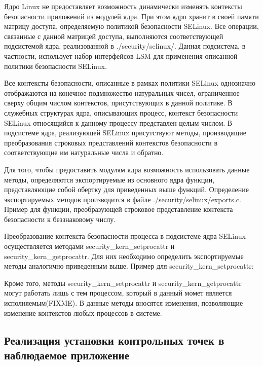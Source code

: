 Ядро Linux не предоставляет возможность динамически изменять
контексты безопасности приложений из модулей ядра. При этом
ядро хранит в своей памяти матрицу доступа, определяемую
политикой безопасности SELinux. Все операции, связанные с
данной матрицей доступа, выполняются соответствующей подсистемой
ядра, реализованной в ./security/selinux/. Данная подсистема,
в частности, использует набор интерфейсов LSM для применения
описанной политики безопасности SELinux.

Все контексты безопасности, описанные в рамках политики SELinux
однозначно отображаются на конечное подмножество натуральных чисел,
ограниченное сверху общим числом контекстов, присутствующих в
данной политике. В служебных структурах ядра, описывающих процесс,
контекст безопасности SELinux относящийся к данному процессу
представлен целым числом. В подсистеме ядра, реализующей SELinux
присутствуют методы, производящие преобразования строковых
представлений контекстов безопасности в соответствующие им
натуральные числа и обратно.



Для того, чтобы предоставить модулям ядра возможность использовать
данные методы, определяются экспортируемые из основного ядра функции,
представляющие собой обертку для приведенных выше функций. Определение
экспортируемых методов производится в файле ./security/selinux/exports.c.
Пример для функции, преобразующей строковое представление контекста
безопасности к беззнаковому числу.



Преобразование контекста безопасности процесса в подсистеме ядра SELinux
осуществляется методами security\_kern\_setprocattr и
security\_kern\_getprocattr. Для них необходимо определить
экспортируемые методы аналогично приведенным выше. Пример для
security\_kern\_setprocattr:



Кроме того, методы security\_kern\_setprocattr и
security\_kern\_getprocattr могут работать лишь с тем процессом,
который в данный момет является исполняемым(FIXME). В данные методы
вносятся изменения, позволяющие изменение контекстов любых процессов
в системе.

\subsection{Реализация установки контрольных точек в наблюдаемое
            приложение}


